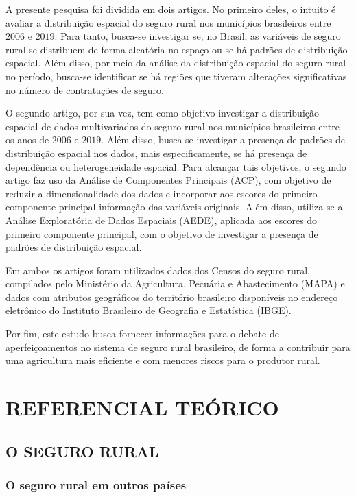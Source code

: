 \documentclass[12pt,a4paper]{article}
\begin{document}
A presente pesquisa foi dividida em dois artigos. No primeiro deles, o intuito é avaliar a distribuição espacial do seguro rural nos municípios brasileiros entre $2006$ e $2019$. Para tanto, busca-se investigar se, no Brasil, as variáveis de seguro rural se distribuem de forma aleatória no espaço ou se há padrões de distribuição espacial. Além disso, por meio da análise da distribuição espacial do seguro rural no período, busca-se identificar se há regiões que tiveram alterações significativas no número de contratações de seguro. 

O segundo artigo, por sua vez, tem como objetivo investigar a distribuição espacial de dados multivariados do seguro rural nos municípios brasileiros entre os anos de $2006$ e $2019$. Além disso, busca-se investigar a presença de padrões de distribuição espacial nos dados, mais especificamente, se há presença de dependência ou heterogeneidade espacial. Para alcançar tais objetivos, o segundo artigo faz uso da Análise de Componentes Principais (ACP), com objetivo de reduzir a dimensionalidade dos dados e incorporar aos escores do primeiro componente principal informação das variáveis originais. Além disso, utiliza-se a Análise Exploratória de Dados Espaciais (AEDE), aplicada aos escores do primeiro componente principal, com o objetivo de investigar a presença de padrões de distribuição espacial.

Em ambos os artigos foram utilizados dados dos Censos do seguro rural, compilados pelo Ministério da Agricultura, Pecuária e Abastecimento (MAPA) e dados com atributos geográficos do território brasileiro disponíveis no endereço eletrônico do Instituto Brasileiro de Geografia e Estatística (IBGE).

Por fim, este estudo busca fornecer informações para o debate de aperfeiçoamentos no sistema de seguro rural brasileiro, de forma a contribuir para uma agricultura mais eficiente e com menores riscos para o produtor rural.

\section{REFERENCIAL TEÓRICO}

\subsection{O SEGURO RURAL}

\subsubsection{O seguro rural em outros países}
\end{document}

